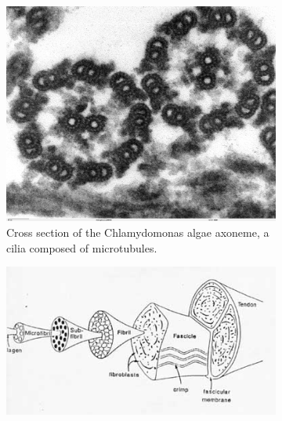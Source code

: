 \begin{figure}\centering
\begin{subfigure}{.28\linewidth}\centering
  \includegraphics[width=\linewidth]{img/Chlamydomonas_TEM_17}
  \caption{Cross section of the Chlamydomonas algae axoneme, a cilia composed of microtubules.}
  \label{fig:material_examples:microtubule}
\end{subfigure}\hfill
\begin{subfigure}{.40\linewidth}\centering
  \includegraphics[width=\linewidth]{img/ligten2}

\end{subfigure}
\end{figure}
